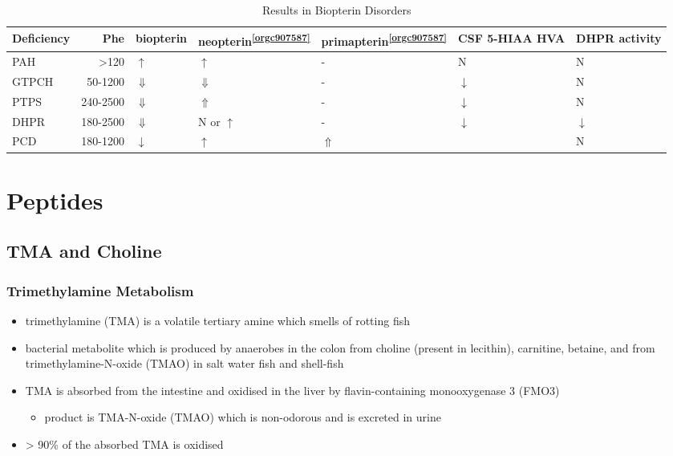 \documentclass{scrartcl}
\begin{document}
\begin{table}[htbp]
\caption{\label{tab:org5d2df03}Results in Biopterin Disorders}
\centering
\begin{tabular}{lrlllll}
Deficiency & Phe & biopterin\footnotemark & neopterin\textsuperscript{\ref{orgc907587}} & primapterin\textsuperscript{\ref{orgc907587}} & CSF 5-HIAA HVA & DHPR activity\\
\hline
PAH & \textgreater{}120 & \(\uparrow\) & \(\uparrow\) & - & N & N\\
GTPCH & 50-1200 & \(\Downarrow\) & \(\Downarrow\) & - & \(\downarrow\) & N\\
PTPS & 240-2500 & \(\Downarrow\) & \(\Uparrow\) & - & \(\downarrow\) & N\\
DHPR & 180-2500 & \(\Downarrow\) & N or \(\uparrow\) & - & \(\downarrow\) & \(\downarrow\)\\
PCD & 180-1200 & \(\downarrow\) & \(\uparrow\) & \(\Uparrow\) &  & N\\
\end{tabular}
\end{table}
\section{Peptides}
\label{sec:orgd48f944}
\subsection{TMA and Choline}
\label{sec:orgd7bf6e2}
\subsubsection{Trimethylamine Metabolism}
\label{sec:org428010f}
\begin{itemize}
\item trimethylamine (TMA) is a volatile tertiary amine which smells of rotting fish
\item bacterial metabolite which is produced by anaerobes in the colon
from choline (present in lecithin), carnitine, betaine, and from
trimethylamine-N-oxide (TMAO) in salt water fish and shell-fish
\item TMA is absorbed from the intestine and oxidised in the liver by
flavin-containing monooxygenase 3 (FMO3)
\begin{itemize}
\item product is TMA-N-oxide (TMAO) which is non-odorous and is
excreted in urine
\end{itemize}
\item \textgreater{} 90\% of the absorbed TMA is oxidised
\end{itemize}
\end{document}
